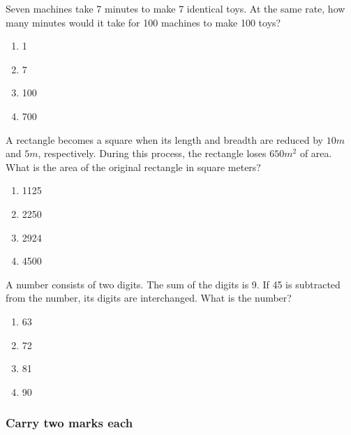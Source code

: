 	\item
	Seven machines take 7 minutes to make 7 identical toys. At the same rate, how many minutes would it take for 100 machines to make 100 toys?

	\hfill{}

	\begin{multicols}{4}
		\begin{enumerate}
			\item 1
			\item 7
			\item 100
			\item 700
		\end{enumerate}
	\end{multicols}

	\item
	A rectangle becomes a square when its length and breadth are reduced by $10m$ and $5m$, respectively. During this process, the rectangle loses $650 m^2$ of area. What is the area of the original rectangle in square meters?

	\hfill{}

	\begin{multicols}{4}
		\begin{enumerate}
			\item 1125
			\item 2250
			\item 2924
			\item 4500
		\end{enumerate}
	\end{multicols}

	\item 
	A number consists of two digits. The sum of the digits is 9. If 45 is subtracted from the number, its digits are interchanged. What is the number?

	\hfill{}

	\begin{multicols}{4}
		\begin{enumerate}
			\item 63
			\item 72
			\item 81
			\item 90
		\end{enumerate}
	\end{multicols}

\subsubsection{Carry two marks each}
	
